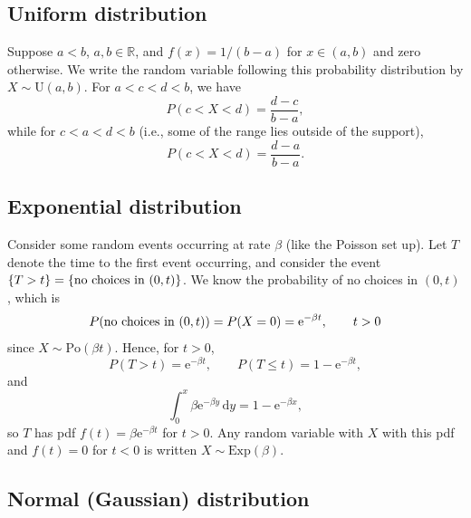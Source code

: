 \documentclass[letter-paper]{tufte-book}
\newcommand{\ex}{\mathrm{e}}
\begin{document}

\subsection{Uniform distribution}

Suppose $a<b$, $a,b\in\mathbb{R}$, and $f(x) = 1/(b-a)$ for $x\in(a,b)$ and zero
otherwise. We write the random variable following this probability distribution
by $X\sim \mbox{U}(a,b)$. For $a<c<d<b$, we have
\begin{equation*}
  P(c<X<d) = \frac{d-c}{b-a},
\end{equation*}
while for $c<a<d<b$ (i.e., some of the range lies outside of the support),
\begin{equation*}
  P(c<X<d) = \frac{d-a}{b-a}.
\end{equation*}


\subsection{Exponential distribution}

Consider some random events occurring at rate $\beta$ (like the Poisson set up).
Let $T$ denote the time to the first event occurring, and consider the event
$\{T>t\} = \{\textnormal{no choices in }(0,t)\}$. We know the probability of no
choices in $(0,t)$, which is
\begin{equation*}
  P(\textnormal{no choices in }(0,t)) = P(X=0) = \ex^{-\beta t},\qquad t>0
\end{equation*}
since $X\sim\mbox{Po}(\beta t)$. Hence, for $t>0$,
\begin{equation*}
  P(T>t) = \ex^{-\beta t},\qquad P(T\leq t) = 1-\ex^{-\beta t},
\end{equation*}
and
\begin{equation*}
  \int_0^x \beta\ex^{-\beta y}\, \mathrm{d}y = 1-\ex^{-\beta x},
\end{equation*}
so $T$ has pdf $f(t) = \beta\ex^{-\beta t}$ for $t>0$. Any random variable with
$X$ with this pdf and $f(t)=0$ for $t<0$ is written $X\sim\mbox{Exp}(\beta)$.


\subsection{Normal (Gaussian) distribution}
\end{document}
